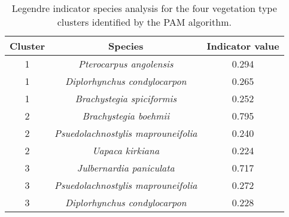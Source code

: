\begin{table}[H]
\centering
\begin{tabular}{ccc}
  \hline
Cluster & Species & Indicator value \\ 
  \hline
1 & \textit{Pterocarpus angolensis} & 0.294 \\ 
  1 & \textit{Diplorhynchus condylocarpon} & 0.265 \\ 
  1 & \textit{Brachystegia spiciformis} & 0.252 \\ 
   \hline
2 & \textit{Brachystegia boehmii} & 0.795 \\ 
  2 & \textit{Psuedolachnostylis maprouneifolia} & 0.240 \\ 
  2 & \textit{Uapaca kirkiana} & 0.224 \\ 
   \hline
3 & \textit{Julbernardia paniculata} & 0.717 \\ 
  3 & \textit{Psuedolachnostylis maprouneifolia} & 0.272 \\ 
  3 & \textit{Diplorhynchus condylocarpon} & 0.228 \\ 
  \end{tabular}
\caption{Legendre indicator species analysis for the four vegetation type clusters identified by the PAM algorithm.} 
\label{indval}
\end{table}

